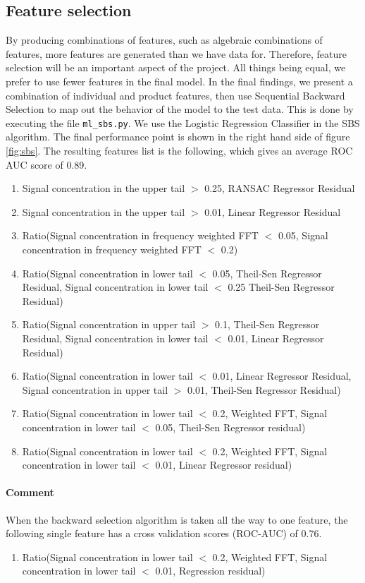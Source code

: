 \documentclass[12pt]{article}
\begin{document}
\subsection{Feature selection}
By producing combinations of features, such as algebraic combinations of features, more features are generated than we have data for. Therefore, feature selection will be an important aspect of the project. All things being equal, we prefer to use fewer features in the final model. In the final findings, we present a combination of individual and product features, then use Sequential Backward Selection to map out the behavior of the model to the test data. This is done by executing the file \verb|ml_sbs.py|. We use the Logistic Regression Classifier in the SBS algorithm. The final performance point is shown in the right hand side of figure \ref{fig:sbs}. 
The resulting features list is the following, which gives an average ROC AUC score of 0.89.
\begin{enumerate}
\item{Signal concentration in the upper tail $>$ 0.25, RANSAC Regressor Residual}
\item{Signal concentration in the upper tail $>$ 0.01, Linear Regressor Residual}
\item{Ratio(Signal concentration in frequency weighted FFT $<$ 0.05, Signal concentration in frequency weighted FFT $<$ 0.2)}
\item{Ratio(Signal concentration in lower tail $<$ 0.05, Theil-Sen Regressor Residual, Signal concentration in lower tail $<$ 0.25 Theil-Sen Regressor Residual)}
\item{Ratio(Signal concentration in upper tail $>$ 0.1, Theil-Sen Regressor Residual, Signal concentration in lower tail $<$ 0.01, Linear Regressor Residual)}
\item{Ratio(Signal concentration in lower tail $<$ 0.01, Linear Regressor Residual, Signal concentration in upper tail $>$ 0.01, Theil-Sen Regressor Residual)}
\item{Ratio(Signal concentration in lower tail $<$ 0.2, Weighted FFT, Signal concentration in lower tail $<$ 0.05, Theil-Sen Regressor residual)}
\item{Ratio(Signal concentration in lower tail $<$ 0.2, Weighted FFT, Signal concentration in lower tail $<$ 0.01, Linear Regressor residual)}
\end{enumerate}

\paragraph{Comment} When the backward selection algorithm is taken all the way to one feature, the following single feature has a cross validation scores (ROC-AUC) of 0.76. 
\begin{enumerate}
\item{Ratio(Signal concentration in lower tail $<$ 0.2, Weighted FFT, Signal concentration in lower tail $<$ 0.01, Regression residual)}
\end{enumerate}
\end{document}
